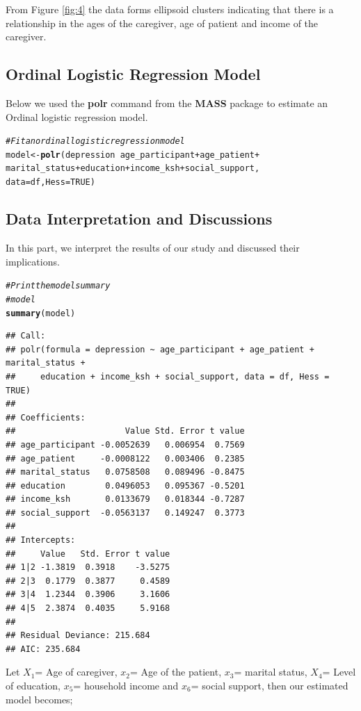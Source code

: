 \documentclass[12pt]{article}\usepackage[]{graphicx}\usepackage[]{xcolor}
\makeatletter
\newcommand{\hlnum}[1]{\textcolor[rgb]{0.686,0.059,0.569}{#1}}%
\newcommand{\hlcom}[1]{\textcolor[rgb]{0.678,0.584,0.686}{\textit{#1}}}%
\newcommand{\hlopt}[1]{\textcolor[rgb]{0,0,0}{#1}}%
\newcommand{\hlstd}[1]{\textcolor[rgb]{0.345,0.345,0.345}{#1}}%
\newcommand{\hlkwb}[1]{\textcolor[rgb]{0.69,0.353,0.396}{#1}}%
\newcommand{\hlkwc}[1]{\textcolor[rgb]{0.333,0.667,0.333}{#1}}%
\newcommand{\hlkwd}[1]{\textcolor[rgb]{0.737,0.353,0.396}{\textbf{#1}}}%
\newenvironment{kframe}{%
 \def\at@end@of@kframe{}%
 \ifinner\ifhmode%
  \def\at@end@of@kframe{\end{minipage}}%
  \begin{minipage}{\columnwidth}%
 \fi\fi%
 \def\FrameCommand##1{\hskip\@totalleftmargin \hskip-\fboxsep
 \colorbox{shadecolor}{##1}\hskip-\fboxsep
     \hskip-\linewidth \hskip-\@totalleftmargin \hskip\columnwidth}%
 \MakeFramed {\advance\hsize-\width
   \@totalleftmargin\z@ \linewidth\hsize
   \@setminipage}}%
 {\par\unskip\endMakeFramed%
 \at@end@of@kframe}
\newenvironment{knitrout}{}{} %
\numberwithin{equation}{section}
\numberwithin{figure}{section}
\makeatother
\begin{document}
\noindent From Figure \ref{fig:4} the data forms ellipsoid clusters indicating that there is a relationship in the ages of the caregiver, age of patient and income of the caregiver.

\subsection{Ordinal Logistic Regression Model}
Below we used the \textbf{polr} command from the \textbf{MASS} package to estimate an Ordinal logistic regression model.
\begin{knitrout}
\color{fgcolor}\begin{kframe}
\begin{alltt}
\hlcom{# Fit an ordinal logistic regression model}
\hlstd{model} \hlkwb{<-} \hlkwd{polr}\hlstd{(depression} \hlopt{~} \hlstd{age_participant} \hlopt{+} \hlstd{age_patient} \hlopt{+}
                \hlstd{marital_status} \hlopt{+} \hlstd{education} \hlopt{+} \hlstd{income_ksh} \hlopt{+} \hlstd{social_support,}
              \hlkwc{data} \hlstd{= df,}\hlkwc{Hess}\hlstd{=}\hlnum{TRUE}\hlstd{)}
\end{alltt}
\end{kframe}
\end{knitrout}

\subsection{Data Interpretation and Discussions}
In this part, we interpret the results of our study and discussed their implications.
\begin{knitrout}
\color{fgcolor}\begin{kframe}
\begin{alltt}
\hlcom{# Print the model summary}
\hlcom{#model}
\hlkwd{summary}\hlstd{(model)}
\end{alltt}
\begin{verbatim}
## Call:
## polr(formula = depression ~ age_participant + age_patient + marital_status + 
##     education + income_ksh + social_support, data = df, Hess = TRUE)
## 
## Coefficients:
##                      Value Std. Error t value
## age_participant -0.0052639   0.006954  0.7569
## age_patient     -0.0008122   0.003406  0.2385
## marital_status   0.0758508   0.089496 -0.8475
## education        0.0496053   0.095367 -0.5201
## income_ksh       0.0133679   0.018344 -0.7287
## social_support  -0.0563137   0.149247  0.3773
## 
## Intercepts:
##     Value   Std. Error t value
## 1|2 -1.3819  0.3918    -3.5275
## 2|3  0.1779  0.3877     0.4589
## 3|4  1.2344  0.3906     3.1606
## 4|5  2.3874  0.4035     5.9168
## 
## Residual Deviance: 215.684 
## AIC: 235.684
\end{verbatim}
\end{kframe}
\end{knitrout}
\noindent  Let $X_1$= Age of caregiver, $x_2$= Age of the patient, $x_3$= marital status, $X_4$= Level of education, $x_5$= household income and $x_6$= social support, then our estimated model becomes;
\end{document}
